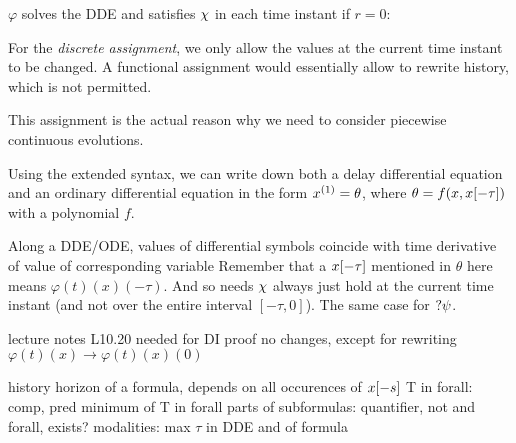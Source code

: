    $\varphi$ solves the DDE and satisfies $\chi$ in each time instant
    if $r=0$: 

    For the \emph{discrete assignment}, we only allow the values at the current time instant to be changed. A functional assignment would essentially allow to rewrite history, which is not permitted.

    This assignment is the actual reason why we need to consider piecewise continuous evolutions.

    


    Using the extended syntax, we can write down both a delay differential equation and an ordinary differential equation in the form $\D{x}=\theta$, where $\theta=f(x,x[-\tau])$ with a polynomial $f$.

    Along a DDE/ODE, values of differential symbols coincide with time derivative of value of corresponding variable
    Remember that a $x[-\tau]$ mentioned in $\theta$ here means $\varphi(t)(x)(-\tau)$.
    And so needs $\chi$ always just hold at the current time instant (and not over the entire interval $[-\tau,0]$). The same case for $?\psi$.

    \begin{lemma}
        lecture notes L10.20
        needed for DI proof
        no changes, except for rewriting $\varphi(t)(x)\rightarrow\varphi(t)(x)(0)$
    \end{lemma}


    \begin{definition}
        history horizon of a \ddL formula, depends on all occurences of $x[-s]$
        T in forall: comp, pred
        minimum of T in forall parts of subformulas: quantifier, not and
        forall, exists?
        modalities: max $\tau$ in DDE and of formula
    \end{definition}


